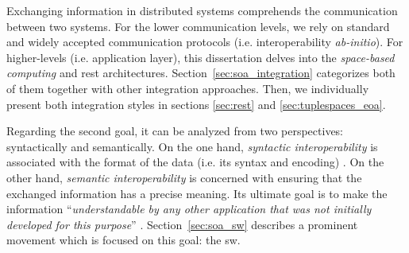 Exchanging information in distributed systems comprehends the communication between two systems.
For the lower communication levels, we rely on standard and widely accepted communication protocols (i.e. interoperability \emph{ab-initio}). %
For higher-levels (i.e. application layer), this dissertation delves into the \emph{space-based computing} and \ac{rest} architectures.
Section~\ref{sec:soa_integration} categorizes both of them together with other integration approaches.
Then, we individually present both integration styles in sections \ref{sec:rest} and \ref{sec:tuplespaces_eoa}.

\medskip

Regarding the second goal, it can be analyzed from two perspectives: syntactically and semantically.
On the one hand, \emph{syntactic interoperability} is associated with the format of the data (i.e. its syntax and encoding) \citep{van_der_veer_achieving_2006}. %
On the other hand, \emph{semantic interoperability} is concerned with ensuring that the exchanged information has a precise meaning.
Its ultimate goal is to make the information ``\emph{understandable by any other application that was not initially developed for this purpose}'' \citep{_european_2004}.
Section~\ref{sec:soa_sw} describes a prominent movement which is focused on this goal: the \acl{sw}. %










